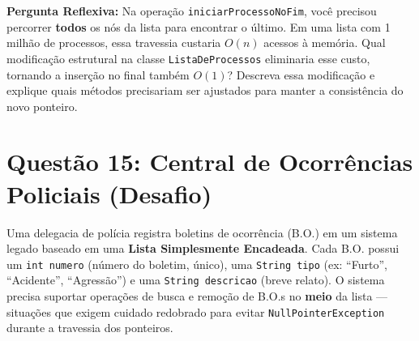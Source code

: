 \documentclass[12pt, a4paper]{article}
\begin{document}
\textbf{Pergunta Reflexiva:} Na operação \texttt{iniciarProcessoNoFim}, você precisou percorrer \textbf{todos} os nós da lista para encontrar o último. Em uma lista com 1 milhão de processos, essa travessia custaria $O(n)$ acessos à memória. Qual modificação estrutural na classe \texttt{ListaDeProcessos} eliminaria esse custo, tornando a inserção no final também $O(1)$? Descreva essa modificação e explique quais métodos precisariam ser ajustados para manter a consistência do novo ponteiro.

\vspace{0.2cm}

\section*{Questão 15: Central de Ocorrências Policiais (Desafio)}
Uma delegacia de polícia registra boletins de ocorrência (B.O.) em um sistema legado baseado em uma \textbf{Lista Simplesmente Encadeada}. Cada B.O. possui um \texttt{int numero} (número do boletim, único), uma \texttt{String tipo} (ex: ``Furto'', ``Acidente'', ``Agressão'') e uma \texttt{String descricao} (breve relato). O sistema precisa suportar operações de busca e remoção de B.O.s no \textbf{meio} da lista — situações que exigem cuidado redobrado para evitar \texttt{NullPointerException} durante a travessia dos ponteiros.
\end{document}
